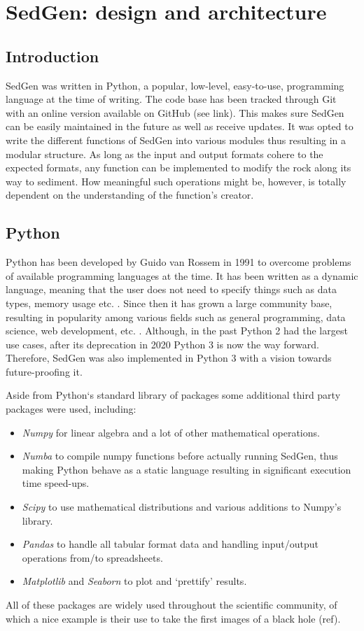 \chapter{SedGen: design and architecture}\label{ch:sedgen_architecture}

%
%
\section{Introduction}
SedGen was written in Python, a popular, low-level, easy-to-use, programming language at the time of writing. %
The code base has been tracked through Git with an online version available on GitHub (see link). %
This makes sure SedGen can be easily maintained in the future as well as receive updates. %
It was opted to write the different functions of SedGen into various modules thus resulting in a modular structure. %
As long as the input and output formats cohere to the expected formats, any function can be implemented to modify the rock along its way to sediment. %
How meaningful such operations might be, however, is totally dependent on the understanding of the function's creator. %


\section{Python}
Python has been developed by Guido van Rossem in 1991 to overcome problems of available programming languages at the time. %
It has been written as a dynamic language, meaning that the user does not need to specify things such as data types, memory usage etc. . %
Since then it has grown a large community base, resulting in popularity among various fields such as general programming, data science, web development, etc. . %
Although, in the past Python 2 had the largest use cases, after its deprecation in 2020 Python 3 is now the way forward. %
Therefore, SedGen was also implemented in Python 3 with a vision towards future-proofing it. %

Aside from Python`s standard library of packages some additional third party packages were used, including:
\begin{itemize}
    \item \textit{Numpy} for linear algebra and a lot of other mathematical operations. %
    \item \textit{Numba} to compile numpy functions before actually running SedGen, thus making Python behave as a static language resulting in significant execution time speed-ups. %
    \item \textit{Scipy} to use mathematical distributions and various additions to Numpy's library. %
    \item \textit{Pandas} to handle all tabular format data and handling input/output operations from/to spreadsheets. %
    \item \textit{Matplotlib} and \textit{Seaborn} to plot and `prettify' results.
\end{itemize}
All of these packages are widely used throughout the scientific community, of which a nice example is their use to take the first images of a black hole (ref). %


